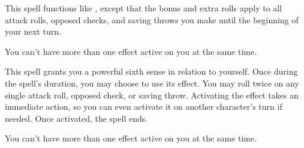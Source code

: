 \begin{spelleffect}
  This spell functions like , except that the bonus and extra rolls apply to all attack rolls, opposed checks, and saving throws you make until the beginning of your next turn.
\end{spelleffect}
\begin{spellnotes}
  You can't have more than one  effect active on you at the same time.
\end{spellnotes}

\begin{spelleffect}
  This spell grants you a powerful sixth sense in relation to yourself. Once during the spell's duration, you may choose to use its effect. You may roll twice on any single attack roll, opposed check, or saving throw. Activating the effect takes an immediate action, so you can even activate it on another character's turn if needed. Once activated, the spell ends.
\end{spelleffect}
\begin{spellnotes}
  You can't have more than one  effect active on you at the same time.
\end{spellnotes}

\begin{comment}
\subsubsection{O-P}
\end{comment}

